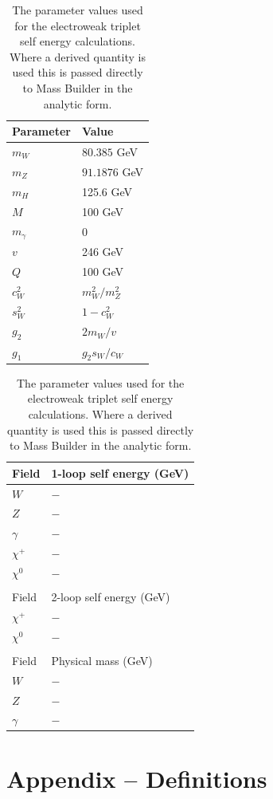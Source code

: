 \documentclass[11pt]{article}
\newcommand{\mb}{\textsf{Mass Builder} \! }
\begin{document}
\begin{table}[h!]
\caption{The parameter values used for the electroweak triplet self energy calculations.  Where a derived quantity is used this is passed directly to \mb in the analytic form.}\label{table:input_params}
\centering
\vspace{0.5cm}
\begin{tabular}{l l}
\hline
Parameter & Value\\
\hline
$m_W$ & $80.385$ GeV \\
$m_Z$ & $91.1876$ GeV \\
$m_H$ & 125.6 GeV\\
$M$ & 100 GeV\\
$m_{\gamma}$ & 0 \\
$v$ & 246 GeV \\
$Q$ & 100 GeV \\
$c_W^2$ & $m^2_W/m^2_Z$ \\
$s_W^2$ & $1-c^2_W$ \\
$g_2$ & $2m_W/v$\\
$g_1$ & $g_2 s_W/c_W$\\
\hline\end{tabular}
\hspace{3cm}
\begin{tabular}{l l}
\hline
Field & 1-loop self energy (GeV)\\
\hline
$W$ & $-$ \\
$Z$ & $-$  \\
$\gamma$ & $-$ \\
$\chi^+$ & $-$ \\
$\chi^0$ & $-$ \\
&\\
\hline
Field & 2-loop self energy (GeV)\\
\hline
$\chi^+$ & $-$ \\
$\chi^0$ & $-$ \\
&\\
\hline
Field & Physical mass (GeV)\\
\hline
$W$ & $-$ \\
$Z$ & $-$  \\
$\gamma$ & $-$\\
\hline\end{tabular}
\end{table}


\newpage
\section{Appendix -- Definitions}
\end{document}
